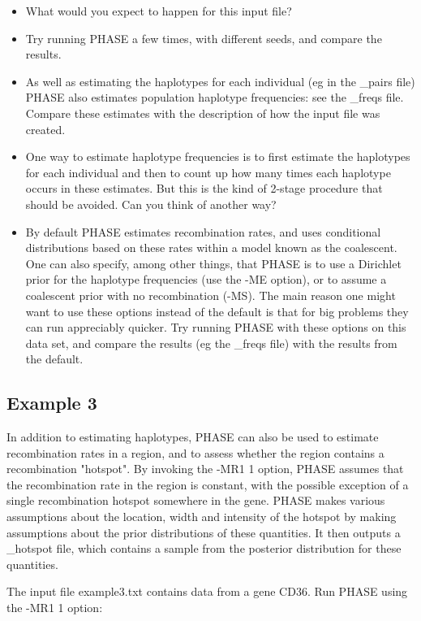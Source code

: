 \begin{itemize}
\item What would you expect to happen for this input file?
\item Try running PHASE a few times, with different seeds, and compare the results.
\item As well as estimating the haplotypes for each individual (eg in the \_pairs file)
PHASE also estimates population haplotype frequencies: see the \_freqs file.
Compare these estimates with the description of how
the input file was created.
\item One way to estimate haplotype frequencies is to first estimate the haplotypes
for each individual and then to count up how many times each haplotype occurs
in these estimates. But this is the kind of 2-stage procedure that should be
avoided. Can you think of another way?
\item By default PHASE estimates recombination rates, and uses conditional
distributions based on these rates within a model known as the coalescent.
One can also specify, among other things, that PHASE is to use a Dirichlet
prior for the haplotype frequencies (use the -ME option), or to assume a coalescent prior with no
recombination (-MS). The main reason one might want to use these options instead
of the default is that for big problems they can run appreciably quicker.
Try running PHASE with these options on this data set, 
and compare the results (eg the \_freqs file) with the results from the default. 
\end{itemize}


\subsection*{Example 3}

In addition to estimating haplotypes, PHASE can also be used
to estimate recombination rates in a region, and to assess whether
the region contains a recombination "hotspot". By invoking the -MR1 1
option, PHASE assumes that the recombination rate in the region
is constant, with the possible exception of a single recombination hotspot
somewhere in the gene. PHASE makes various assumptions about the
location, width and intensity of the hotspot by making assumptions
about the prior distributions of these quantities. It then outputs
a \_hotspot file, which contains a sample from the posterior distribution
for these quantities.


The input file example3.txt
contains data from a gene CD36.
Run PHASE using the -MR1 1 option:

